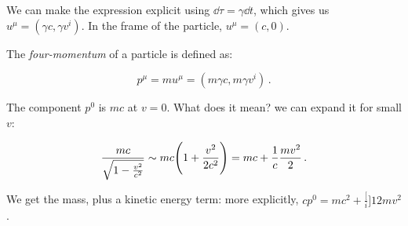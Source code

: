 \documentclass[main.tex]{subfiles}
\begin{document}
We can make the expression explicit using \(\dd{\tau} = \gamma \dd{t}\), which gives us \(u^{\mu} = (\gamma c, \gamma v^{i})\).
In the frame of the particle, \(u^{\mu} = (c, 0)\).   

The \emph{four-momentum} of a particle is defined as: 

\begin{equation}
  p^{\mu} = m u^{\mu} = (m \gamma c, m \gamma v^{i})\,.
\end{equation}

The component \(p^{0}\) is \(mc\) at \(v=0\). What does it mean? we can expand it for small \(v\):

\begin{equation}
  \frac{mc}{\sqrt{1 - \frac{v^{2}}{c^{2}}}} \sim
  mc \qty(1 + \frac{v^{2}}{2 c^{2} } )
  = mc + \frac{1}{c} \frac{mv^{2}}{2}\,.
\end{equation}

We get the mass, plus a kinetic energy term: more explicitly, \(cp^0 = mc^{2} + \frac[i]{1}{2} m v^{2}\).
\end{document}
